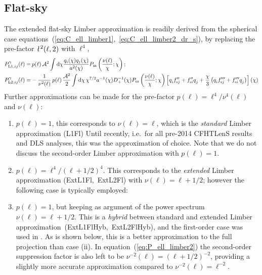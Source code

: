 \documentclass[fleqn,usenatbib]{mnras} %
\newcommand{\ellbar}{\hbox{\it \l}\,}
\newcommand{\pref}{{\cal A}}
\newcommand{\LabelTxt}[1]{(\mbox{#1})}
\begin{document}
\subsection{Flat-sky}
\label{sec:Limber_flat_sky}

The extended flat-sky Limber approximation is readily derived from the
spherical case equations~(\ref{eq:C_ell_limber1},~\ref{eq:C_ell_limber2_dr_s}), by
replacing the pre-factor $\ellbar^2(\ell, 2)$ with $\ell^4$,
%
\begin{align}
  P^\gamma_{{\rm L1}, ij}(\ell) = & \, p(\ell) \, \pref^2 \int {\rm d} \chi \frac{ q_i(\chi) q_j(\chi) }{a^2(\chi)}
  P_{\rm m}\left(\frac{\nu(\ell)}{\chi}; \chi\right);
  \label{eq:P_ell_limber1}
  \\
    P^\gamma_{{\rm L2}, ij}(\ell) = & - \frac 1 {\nu^2(\ell)} \, p(\ell) \, \frac{\pref^2}{2}
    \int {\rm d} \chi \, \chi^{7/2} a^{-1}(\chi) D_+^{-1}(\chi) P_{\rm m}\left(\frac{\nu(\ell)}\chi; \chi\right)
    \left[ q^{}_i f^{\prime\prime}_{{\rm s}j} + f^{\prime\prime}_{{\rm s}i} q^{}_j  
      + \frac{\chi}{3} \left( q^{}_i f^{\prime\prime\prime}_{{\rm s}j} + f^{\prime\prime\prime}_{{\rm s}i} q^{}_j
      \right)
    \right](\chi)
  \label{eq:P_ell_limber2}
\end{align}
%
Further approximations can be made for the pre-factor $p(\ell) = \ell^4/\nu^4(\ell)$ and $\nu(\ell)$:
%
\begin{enumerate}
  \item $p(\ell) = 1$, this corresponds to $\nu(\ell) = \ell$, which is the
    \emph{standard} Limber approximation \LabelTxt{L1Fl} Until recently,
  i.e.~for all pre-2014 CFHTLenS results and DLS
  \citep{2012arXiv1210.2732J} analyses, this was the approximation of choice. Note that
  we do not discuss the second-order Limber approximation with $p(\ell)=1$.
  \item $p(\ell) = \ell^4/(\ell + 1/2)^4$. This corresponds to the
  \emph{extended} Limber approximation \LabelTxt{ExtL1Fl, ExtL2Fl} with
  $\nu(\ell) = \ell + 1/2$; however the following case is typically employed:
  \item $p(\ell) = 1$, but keeping as argument of the power spectrum $\nu(\ell) = \ell + 1/2$. This is
    a \emph{hybrid} between
    standard and extended Limber approximation~\LabelTxt{ExtL1FlHyb, ExtL2FlHyb}, and the first-order case 
    was used in \cite{KiDS-450,joudaki/etal:2016,joudaki/etal:2017,abbott/etal:2016}. As is shown
    below, this is a better approximation to the full projection than case (ii). In equation~(\ref{eq:P_ell_limber2})
    the second-order suppression factor is also left to be $\nu^{-2}(\ell) = (\ell + 1/2)^{-2}$, providing
    a slightly more accurate approximation compared to $\nu^{-2}(\ell) = \ell^{-2}$.
\end{enumerate}
\end{document}
